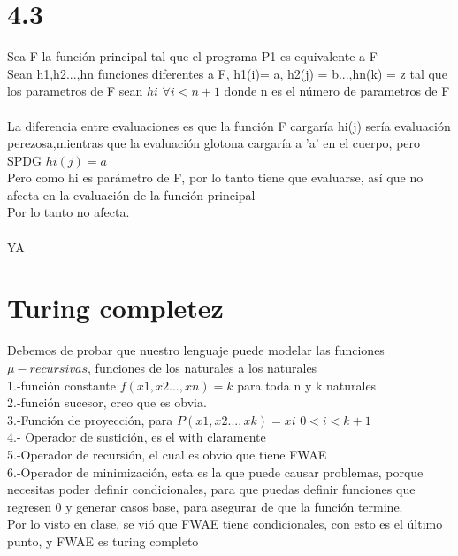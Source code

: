 \documentclass{article}
\begin{document}
\section{4.3}
Sea F la función principal tal que el programa P1 es equivalente a F\\
Sean h1,h2...,hn funciones diferentes a F, h1(i)= a, h2(j) = b...,hn(k) = z tal que los parametros de F sean $hi$  $ \forall i <n+1$ donde n es el número de parametros de F\\
\\La diferencia entre evaluaciones es que la función F
cargaría hi(j) sería evaluación perezosa,mientras que la evaluación glotona cargaría a 'a' en el cuerpo,
pero SPDG $hi(j) = a $\\
Pero como hi es parámetro de F, por lo tanto tiene que evaluarse, así que no afecta en la evaluación de la función principal\\
Por lo tanto no afecta.\\ \\
YA

\section{Turing completez}
Debemos de probar que nuestro lenguaje puede modelar las  funciones $μ-recursivas$, funciones de los naturales a los naturales\\
1.-función constante $f(x1,x2...,xn) = k$ para toda n y k naturales
\\2.-función sucesor, creo que es obvia.
\\3.-Función de proyección, para  $P(x1,x2...,xk)=xi$  $0<i<k+1$
\\4.- Operador de sustición, es el with claramente\\
5.-Operador de recursión, el cual es obvio que tiene FWAE
\\6.-Operador de minimización, esta es la que puede causar problemas, porque necesitas poder definir condicionales,
para que puedas definir funciones que regresen 0 y generar casos base, para asegurar de que la función termine.\\
Por lo visto en clase, se vió que FWAE tiene condicionales, con esto es el último punto, y FWAE es turing completo
\end{document}
